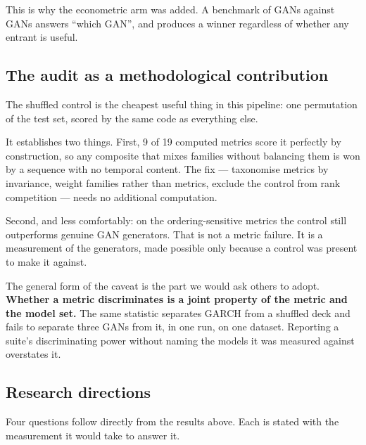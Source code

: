 \documentclass[11pt,a4paper]{article}
\makeatletter
\DeclareRobustCommand{\_}{\ifmmode\nfss@text{\textunderscore}\else\textunderscore\allowbreak\fi}
\makeatother
\begin{document}
This is why the econometric arm was added. A benchmark of GANs against GANs answers ``which GAN'', and produces a winner regardless of whether any entrant is useful.

\subsection{The audit as a methodological contribution}
The shuffled control is the cheapest useful thing in this pipeline: one permutation of the test set, scored by the same code as everything else.

It establishes two things. First, 9 of 19 computed metrics score it perfectly by construction, so any composite that mixes families without balancing them is won by a sequence with no temporal content. The fix --- taxonomise metrics by invariance, weight families rather than metrics, exclude the control from rank competition --- needs no additional computation.

Second, and less comfortably: on the ordering-sensitive metrics the control still outperforms genuine GAN generators. That is not a metric failure. It is a measurement of the generators, made possible only because a control was present to make it against.

The general form of the caveat is the part we would ask others to adopt. \textbf{Whether a metric discriminates is a joint property of the metric and the model set.} The same statistic separates GARCH from a shuffled deck and fails to separate three GANs from it, in one run, on one dataset. Reporting a suite's discriminating power without naming the models it was measured against overstates it.

\subsection{Research directions}
\label{sec:directions}
Four questions follow directly from the results above. Each is stated with the measurement it would take to answer it.
\end{document}
